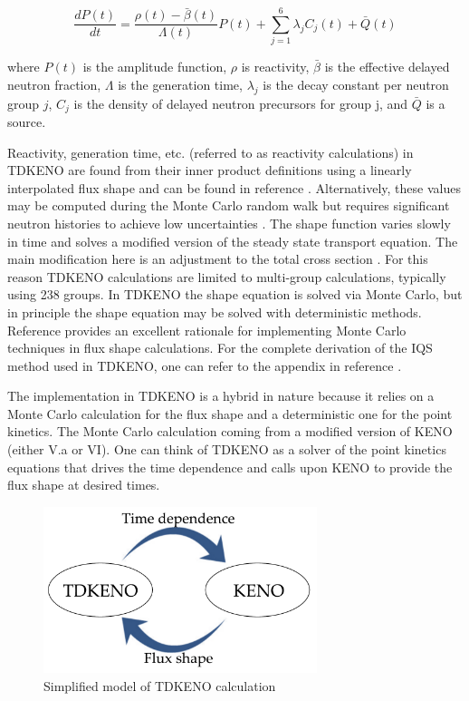 \documentclass[11pt]{article}
\begin{document}
\begin{equation}
    \label{eq:pt_kin}
    \frac{dP(t)}{dt} = \frac{\rho(t)-\bar{\beta}(t)}{\Lambda(t)} P(t) + \sum_{j=1}^{6} \lambda_jC_j(t) + \bar{Q}(t)
\end{equation}

where $P(t)$ is the amplitude function, $\rho$ is reactivity, $\bar{\beta}$ is the effective delayed neutron fraction, $\Lambda$ is the generation time, $\lambda_j$ is the decay constant per neutron group $j$, $C_j$ is the density of delayed neutron precursors for group j, and $\bar{Q}$ is a source.

 Reactivity, generation time, etc. (referred to as reactivity calculations) in TDKENO are found from their inner product definitions using a linearly interpolated flux shape and can be found in reference \cite{Bentley}.  Alternatively, these values may be computed during the Monte Carlo random walk but requires significant neutron histories to achieve low uncertainties \cite{Waddell}.  The shape function varies slowly in time and solves a modified version of the steady state transport equation.  The main modification here is an adjustment to the total cross section \cite{goluoglu2001time}\cite{Gehin}.  For this reason TDKENO calculations are limited to multi-group calculations, typically using 238 groups.  In TDKENO the shape equation is solved via Monte Carlo, but in principle the shape equation may be solved with deterministic methods.  Reference \cite{Shayesteh} provides an excellent rationale for implementing Monte Carlo techniques in flux shape calculations.  For the complete derivation of the IQS method used in TDKENO, one can refer to the appendix in reference \cite{Bentley}. 
 
 The implementation in TDKENO is a hybrid in nature because it relies on a Monte Carlo calculation for the flux shape and a deterministic one for the point kinetics.  The Monte Carlo calculation coming from a modified version of KENO (either V.a or VI).  One can think of TDKENO as a solver of the point kinetics equations that drives the time dependence and calls upon KENO to provide the flux shape at desired times. 
 \begin{figure}
     \centering
     \includegraphics[width=8cm]{figures/tdkeno_flow.pdf}
     \caption{Simplified model of TDKENO calculation}
     \label{fig:simpletdk}
 \end{figure}
\end{document}
